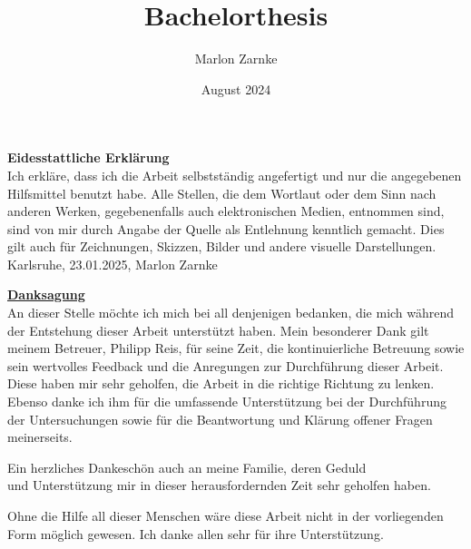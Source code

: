 \documentclass[a4paper, 12pt]{scrreprt}
\title{Bachelorthesis}
\author{Marlon Zarnke}
\date{August 2024}
\begin{document}
\newpage
\thispagestyle{empty}



\newpage

\setcounter{page}{1}

\begin{center}
\textbf{Eidesstattliche Erklärung}\\
Ich erkläre, dass ich die Arbeit selbstständig angefertigt und nur die angegebenen
Hilfsmittel benutzt habe. Alle Stellen, die dem Wortlaut oder dem Sinn nach anderen
Werken, gegebenenfalls auch elektronischen Medien, entnommen sind, sind von mir
durch Angabe der Quelle als Entlehnung kenntlich gemacht. Dies gilt auch für
Zeichnungen, Skizzen, Bilder und andere visuelle Darstellungen.\\
Karlsruhe, 23.01.2025, Marlon Zarnke
\end{center}



\newpage
\begin{center}
\underline{\textbf{Danksagung}}\\
An dieser Stelle möchte ich mich bei all denjenigen bedanken, die mich während der Entstehung dieser Arbeit unterstützt haben. Mein besonderer Dank gilt meinem Betreuer, Philipp Reis, für seine Zeit, die kontinuierliche Betreuung sowie sein wertvolles Feedback und die Anregungen zur Durchführung dieser Arbeit. Diese haben mir sehr geholfen, die Arbeit in die richtige Richtung zu lenken. Ebenso danke ich ihm für die umfassende Unterstützung bei der Durchführung der Untersuchungen sowie für die Beantwortung und Klärung offener Fragen meinerseits.

Ein herzliches Dankeschön auch an meine Familie, deren Geduld\\
und Unterstützung mir in dieser herausfordernden Zeit sehr geholfen haben.

Ohne die Hilfe all dieser Menschen wäre diese Arbeit nicht in der vorliegenden Form möglich gewesen. Ich danke allen sehr für ihre Unterstützung.
\end{center}

\tableofcontents

\newpage
{}
\setcounter{page}{1}




%






\printbibliography
\end{document}
